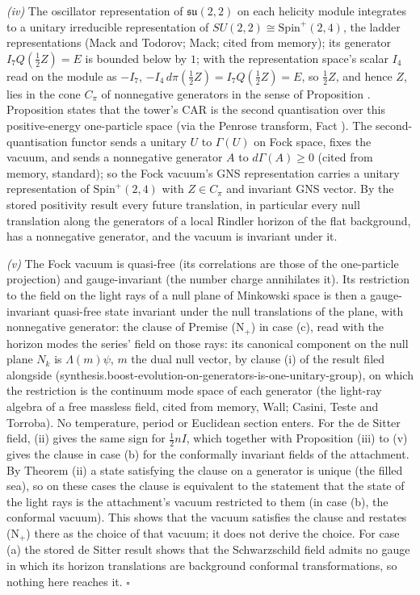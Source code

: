 \emph{(iv)} The oscillator representation of $\mathfrak{su}(2,2)$ on each helicity module integrates to a unitary irreducible representation of $SU(2,2) \cong \mathrm{Spin}^{+}(2,4)$, the ladder representations (Mack and Todorov; Mack; cited from memory); its generator $I_{7}Q(\tfrac12 Z) = E$ is bounded below by $1$; with the representation space's scalar $I_{4}$ read on the module as $-I_{7}$, $-I_{4}\,d\pi(\tfrac12 Z) = I_{7}Q(\tfrac12 Z) = E$, so $\tfrac12 Z$, and hence $Z$, lies in the cone $C_{\pi}$ of nonnegative generators in the sense of Proposition . Proposition  states that the tower's CAR is the second quantisation over this positive-energy one-particle space (via the Penrose transform, Fact ). The second-quantisation functor sends a unitary $U$ to $\Gamma(U)$ on Fock space, fixes the vacuum, and sends a nonnegative generator $A$ to $d\Gamma(A) \ge 0$ (cited from memory, standard); so the Fock vacuum's GNS representation carries a unitary representation of $\mathrm{Spin}^{+}(2,4)$ with $Z \in C_{\pi}$ and invariant GNS vector. By the stored positivity result every future translation, in particular every null translation along the generators of a local Rindler horizon of the flat background, has a nonnegative generator, and the vacuum is invariant under it.

\emph{(v)} The Fock vacuum is quasi-free (its correlations are those of the one-particle projection) and gauge-invariant (the number charge annihilates it). Its restriction to the field on the light rays of a null plane of Minkowski space is then a gauge-invariant quasi-free state invariant under the null translations of the plane, with nonnegative generator: the clause of Premise (N$_{+}$) in case (c), read with the horizon modes the series' field on those rays: its canonical component on the null plane $N_{k}$ is $\Lambda(m)\psi$, $m$ the dual null vector, by clause (i) of the result filed alongside (synthesis.boost-evolution-on-generators-is-one-unitary-group), on which the restriction is the continuum mode space of each generator (the light-ray algebra of a free massless field, cited from memory, Wall; Casini, Teste and Torroba). No temperature, period or Euclidean section enters. For the de Sitter field, (ii) gives the same sign for $\tfrac12 nI$, which together with Proposition (iii) to (v) gives the clause in case (b) for the conformally invariant fields of the attachment. By Theorem (ii) a state satisfying the clause on a generator is unique (the filled sea), so on these cases the clause is equivalent to the statement that the state of the light rays is the attachment's vacuum restricted to them (in case (b), the conformal vacuum). This shows that the vacuum satisfies the clause and restates (N$_{+}$) there as the choice of that vacuum; it does not derive the choice. For case (a) the stored de Sitter result shows that the Schwarzschild field admits no gauge in which its horizon translations are background conformal transformations, so nothing here reaches it. $\square$
